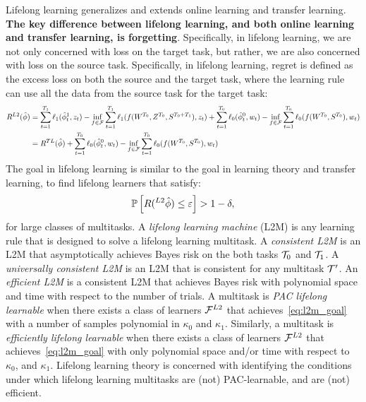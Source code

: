 \documentclass{article}
\begin{document}
Lifelong learning generalizes and extends online learning and transfer learning.  \textbf{The key difference between lifelong learning, and both online learning and transfer learning, is forgetting}.  Specifically, in lifelong learning, we are not only concerned with loss on the target task, but rather, we are also concerned with loss on the source task.  Specifically, in lifelong learning, regret is defined as the excess loss on both the source and the target task, where the learning rule can use all the data from the source task for the target task:
\begin{align} \label{eq:l2m_goal}
    R^{L2}(\hat{\phi}) &= 
    \sum_{t=1}^{T_1} \ell_1(\hat{\phi}^1_t, z_t)   
    - \inf_{f \in \mathcal{F}} \sum_{t=1}^{T_1} \ell_1(f(W^{T_0}, Z^{T_0}, S^{T_0+T_1}), z_t)
    + \sum_{t=1}^{T_0} \ell_0(\hat{\phi}^0_t, w_t)  
    - \inf_{f \in \mathcal{F}} \sum_{t=1}^{T_0} \ell_0(f(W^{T_0}, S^{T_0}), w_t)  \nonumber
    \\
    &= R^{TL}(\hat{\phi}) 
    + \sum_{t=1}^{T_0} \ell_0(\hat{\phi}^0_t, w_t) 
    - \inf_{f \in \mathcal{F}} \sum_{t=1}^{T_0} \ell_0(f(W^{T_0}, S^{T_0}), w_t) 
\end{align}
The goal in lifelong learning is similar to the goal in learning theory and transfer learning, to find lifelong learners that satisfy:
\begin{align} \label{eq:l2m_goal}
    \mathbb{P}\left[R(^{L2}\hat{\phi})  \leq \varepsilon \right] > 1 - \delta,
\end{align}
for large classes of multitasks.  A \emph{lifelong learning machine} (L2M) is any learning rule that is designed to solve a lifelong learning multitask. A \emph{consistent L2M} is an L2M that asymptotically achieves Bayes risk on the both tasks $\mathcal{T}_0$ and $\mathcal{T}_1$.  
A \emph{universally consistent L2M} is an L2M that is consistent for any multitask $\mathcal{T}'$.  
An \emph{efficient L2M}  is a consistent L2M that achieves Bayes risk with polynomial space and time with respect to the number of trials. 
A multitask is \emph{PAC lifelong learnable} when there exists a class of learners $\mathcal{F}^{L2}$ that achieves~\eqref{eq:l2m_goal} with a number of samples polynomial in $\kappa_0$ and $\kappa_1$.  Similarly, a multitask is \emph{efficiently lifelong learnable} when there exists a class of learners $\mathcal{F}^{L2}$ that achieves~\eqref{eq:l2m_goal} with only polynomial space and/or time with respect to $\kappa_0$, and $ \kappa_1$.
{Lifelong learning theory is concerned with identifying the conditions under which lifelong learning multitasks are (not) PAC-learnable, and are (not) efficient.}
\end{document}

